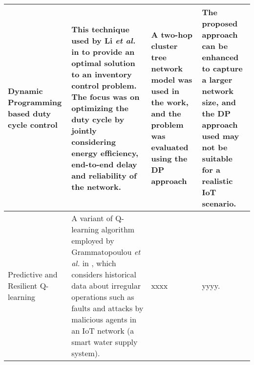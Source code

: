 \documentclass[journal]{IEEEtran}
\begin{document}
\begin{landscape}
\begin{table}
\begin{tabular}{llll}
\multicolumn{1}{m{3cm}}{Dynamic Programming based duty cycle control} & \multicolumn{1}{m{6cm}}{This technique used by Li \emph{et al.} in \cite{Li2014} to provide an optimal solution to an inventory control problem. The focus was on optimizing the duty cycle by jointly considering energy efficiency, end-to-end delay and reliability of the network.} & \multicolumn{1}{m{6cm}}{A two-hop cluster tree network model was used in the work, and the problem was evaluated using the DP approach} & \multicolumn{1}{m{6cm}}{The proposed approach can be enhanced to capture a larger network size, and the DP approach used may not be suitable for a realistic IoT scenario.}\\ \hline

\multicolumn{1}{m{3cm}}{Predictive and Resilient Q-learning} & \multicolumn{1}{m{6cm}}{A variant of Q-learning algorithm employed by Grammatopoulou \emph{et al.} in \cite{Grammatopoulou2018}, which considers historical data about irregular operations such as faults and attacks by malicious agents in an IoT network (a smart water supply system).} & \multicolumn{1}{m{6cm}}{xxxx} & \multicolumn{1}{m{6cm}}{yyyy.}\\ \hline


%
%
%


\hline
 \end{tabular}
 \end{table}
\end{landscape}
\end{document}
